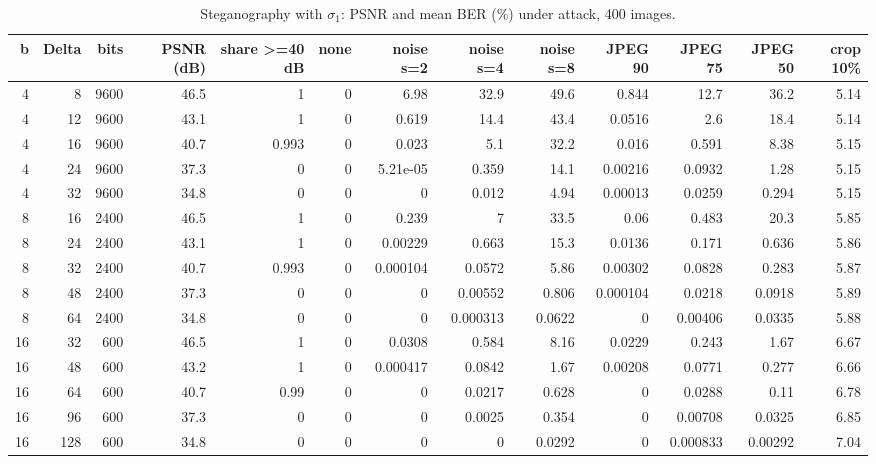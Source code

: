 \begin{table}[htbp]
\caption{Steganography with $\sigma_1$: PSNR and mean BER (\%) under attack, 400 images.}
\label{tab:stego_sigma1}
\begin{tabular}{rrrrrrrrrrrrr}
\toprule
b & Delta & bits & PSNR (dB) & share >=40 dB & none & noise s=2 & noise s=4 & noise s=8 & JPEG 90 & JPEG 75 & JPEG 50 & crop 10\% \\
\midrule
4 & 8 & 9600 & 46.5 & 1 & 0 & 6.98 & 32.9 & 49.6 & 0.844 & 12.7 & 36.2 & 5.14 \\
4 & 12 & 9600 & 43.1 & 1 & 0 & 0.619 & 14.4 & 43.4 & 0.0516 & 2.6 & 18.4 & 5.14 \\
4 & 16 & 9600 & 40.7 & 0.993 & 0 & 0.023 & 5.1 & 32.2 & 0.016 & 0.591 & 8.38 & 5.15 \\
4 & 24 & 9600 & 37.3 & 0 & 0 & 5.21e-05 & 0.359 & 14.1 & 0.00216 & 0.0932 & 1.28 & 5.15 \\
4 & 32 & 9600 & 34.8 & 0 & 0 & 0 & 0.012 & 4.94 & 0.00013 & 0.0259 & 0.294 & 5.15 \\
8 & 16 & 2400 & 46.5 & 1 & 0 & 0.239 & 7 & 33.5 & 0.06 & 0.483 & 20.3 & 5.85 \\
8 & 24 & 2400 & 43.1 & 1 & 0 & 0.00229 & 0.663 & 15.3 & 0.0136 & 0.171 & 0.636 & 5.86 \\
8 & 32 & 2400 & 40.7 & 0.993 & 0 & 0.000104 & 0.0572 & 5.86 & 0.00302 & 0.0828 & 0.283 & 5.87 \\
8 & 48 & 2400 & 37.3 & 0 & 0 & 0 & 0.00552 & 0.806 & 0.000104 & 0.0218 & 0.0918 & 5.89 \\
8 & 64 & 2400 & 34.8 & 0 & 0 & 0 & 0.000313 & 0.0622 & 0 & 0.00406 & 0.0335 & 5.88 \\
16 & 32 & 600 & 46.5 & 1 & 0 & 0.0308 & 0.584 & 8.16 & 0.0229 & 0.243 & 1.67 & 6.67 \\
16 & 48 & 600 & 43.2 & 1 & 0 & 0.000417 & 0.0842 & 1.67 & 0.00208 & 0.0771 & 0.277 & 6.66 \\
16 & 64 & 600 & 40.7 & 0.99 & 0 & 0 & 0.0217 & 0.628 & 0 & 0.0288 & 0.11 & 6.78 \\
16 & 96 & 600 & 37.3 & 0 & 0 & 0 & 0.0025 & 0.354 & 0 & 0.00708 & 0.0325 & 6.85 \\
16 & 128 & 600 & 34.8 & 0 & 0 & 0 & 0 & 0.0292 & 0 & 0.000833 & 0.00292 & 7.04 \\
\bottomrule
\end{tabular}
\end{table}
